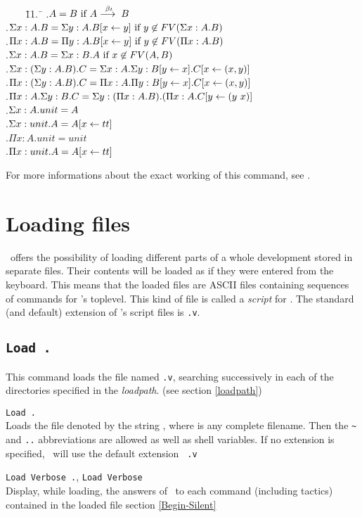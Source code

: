 \begin{tabbing}
\ \ \ \ \=11.\ \=\kill
{}.\>$A=B\mbox{ if }A\stackrel{\beta{}\iota{}}{\longrightarrow{}}B$\\
.\>$\Sigma{}x:A.B=\Sigma{}y:A.B[x\leftarrow{}y]\mbox{ if }y\not\in{}FV(\Sigma{}x:A.B)$\\
.\>$\Pi{}x:A.B=\Pi{}y:A.B[x\leftarrow{}y]\mbox{ if }y\not\in{}FV(\Pi{}x:A.B)$\\
.\>$\Sigma{}x:A.B=\Sigma{}x:B.A\mbox{ if }x\not\in{}FV(A,B)$\\
.\>$\Sigma{}x:(\Sigma{}y:A.B).C=\Sigma{}x:A.\Sigma{}y:B[y\leftarrow{}x].C[x\leftarrow{}(x,y)]$\\
.\>$\Pi{}x:(\Sigma{}y:A.B).C=\Pi{}x:A.\Pi{}y:B[y\leftarrow{}x].C[x\leftarrow{}(x,y)]$\\
.\>$\Pi{}x:A.\Sigma{}y:B.C=\Sigma{}y:(\Pi{}x:A.B).(\Pi{}x:A.C[y\leftarrow{}(y\mbox{ }{}x)]$\\
.\>$\Sigma{}x:A.unit=A$\\
.\>$\Sigma{}x:unit.A=A[x\leftarrow{}tt]$\\
.\>$\Pi{}x:A.unit=unit$\\
.\>$\Pi{}x:unit.A=A[x\leftarrow{}tt]$
\end{tabbing}

For more informations about the exact working of this command, see
\cite{Del97}.

\section{Loading files}

\Coq\ offers the possibility of loading different
parts of a whole development stored in separate files. Their contents
will be loaded as if they were entered from the keyboard. This means
that the loaded files are ASCII files containing sequences of commands
for \Coq's toplevel. This kind of file is called a {\em script} for
\Coq{}. The standard (and default) extension of
\Coq's script files is {\tt .v}.

\subsection{\tt Load {\ident}.}
\label{Load}
This command loads the file named {\ident}{\tt .v}, searching
successively in each of the directories specified in the {\em
  loadpath}. (see section \ref{loadpath})

\begin{Variants}
\item {\tt Load {\str}.}\label{Load-str}\\
  Loads the file denoted by the string {\str}, where {\str} is any
  complete filename. Then the \verb.~. and {\tt ..}
  abbreviations are allowed as well as shell variables. If no
  extension is specified, \Coq\ will use the default extension {\tt
    .v}
\item {\tt Load Verbose {\ident}.}, 
  {\tt Load Verbose {\str}}\\
  Display, while loading, the answers of \Coq\ to each command
  (including tactics) contained in the loaded file
  \SeeAlso section \ref{Begin-Silent}
\end{Variants}

